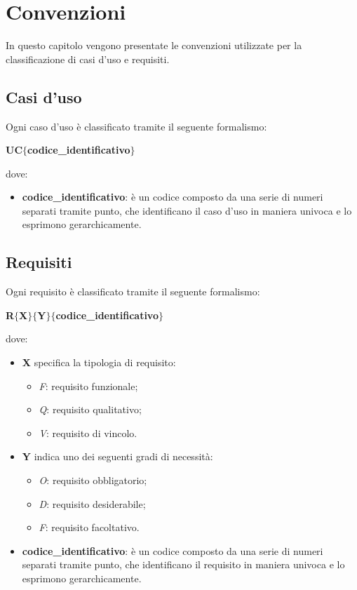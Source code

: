 \chapter{Convenzioni} \label{convenzioni}

In questo capitolo vengono presentate le convenzioni utilizzate per la classificazione di casi d'uso e requisiti.

\section{Casi d'uso}

Ogni caso d'uso è classificato tramite il seguente formalismo:
\begin{center}
	\textbf{UC$\{$codice\_identificativo$\}$}
\end{center}

dove:

\begin{itemize}
	\item \textbf{codice\_identificativo}: è un codice composto da una serie di numeri separati tramite punto, che identificano il caso d'uso in maniera univoca e lo esprimono gerarchicamente.
\end{itemize}

\section{Requisiti}

Ogni requisito è classificato tramite il seguente formalismo:
\begin{center}
	\textbf{R$\{$X$\}$$\{$Y$\}$$\{$codice\_identificativo$\}$}
\end{center}

dove:

\begin{itemize}
	\item \textbf{X} specifica la tipologia di requisito:
        \begin{itemize}
            \item \textit{F}: requisito funzionale;
            \item \textit{Q}: requisito qualitativo;
            \item \textit{V}: requisito di vincolo.
        \end{itemize}
    \item \textbf{Y} indica uno dei seguenti gradi di necessità:
        \begin{itemize}
            \item \textit{O}: requisito obbligatorio;
            \item \textit{D}: requisito desiderabile;
            \item \textit{F}: requisito facoltativo.
        \end{itemize}
    \item \textbf{codice\_identificativo}: è un codice composto da una serie di numeri separati tramite
    punto, che identificano il requisito in maniera univoca e lo esprimono gerarchicamente.
\end{itemize}    
